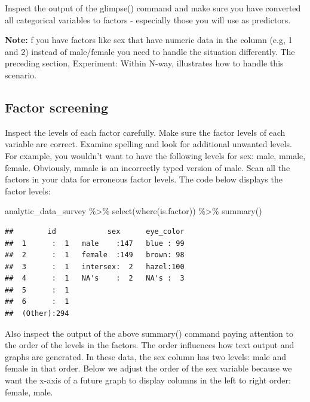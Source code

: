 \documentclass[
]{krantz}
\makeatletter
\newenvironment{Shaded}{\begin{snugshade}}{\end{snugshade}}
\newcommand{\FunctionTok}[1]{\textcolor[rgb]{0,0,0}{#1}}
\newcommand{\NormalTok}[1]{#1}
\newcommand{\SpecialCharTok}[1]{\textcolor[rgb]{0,0,0}{#1}}
\newenvironment{kframe}{%
\medskip{}
\setlength{\fboxsep}{.8em}
 \def\at@end@of@kframe{}%
 \ifinner\ifhmode%
  \def\at@end@of@kframe{\end{minipage}}%
  \begin{minipage}{\columnwidth}%
 \fi\fi%
 \def\FrameCommand##1{\hskip\@totalleftmargin \hskip-\fboxsep
 \colorbox{shadecolor}{##1}\hskip-\fboxsep
     \hskip-\linewidth \hskip-\@totalleftmargin \hskip\columnwidth}%
 \MakeFramed {\advance\hsize-\width
   \@totalleftmargin\z@ \linewidth\hsize
   \@setminipage}}%
 {\par\unskip\endMakeFramed%
 \at@end@of@kframe}
\renewenvironment{Shaded}{\begin{kframe}}{\end{kframe}}
\makeatother
\begin{document}
Inspect the output of the glimpse() command and make sure you have converted all categorical variables to factors - especially those you will use as predictors.

\textbf{Note:} f you have factors like sex that have numeric data in the column (e.g, 1 and 2) instead of male/female you need to handle the situation differently. The preceding section, Experiment: Within N-way, illustrates how to handle this scenario.

\hypertarget{factor-screening-3}{%
\subsection{Factor screening}\label{factor-screening-3}}

Inspect the levels of each factor carefully. Make sure the factor levels of each variable are correct. Examine spelling and look for additional unwanted levels. For example, you wouldn't want to have the following levels for sex: male, mmale, female. Obviously, mmale is an incorrectly typed version of male. Scan all the factors in your data for erroneous factor levels. The code below displays the factor levels:

\begin{Shaded}
\begin{Highlighting}[]
\NormalTok{analytic\_data\_survey }\SpecialCharTok{\%\textgreater{}\%}
  \FunctionTok{select}\NormalTok{(}\FunctionTok{where}\NormalTok{(is.factor)) }\SpecialCharTok{\%\textgreater{}\%}
  \FunctionTok{summary}\NormalTok{()}
\end{Highlighting}
\end{Shaded}

\begin{verbatim}
##        id            sex      eye_color  
##  1      :  1   male    :147   blue : 99  
##  2      :  1   female  :149   brown: 98  
##  3      :  1   intersex:  2   hazel:100  
##  4      :  1   NA's    :  2   NA's :  3  
##  5      :  1                             
##  6      :  1                             
##  (Other):294
\end{verbatim}

Also inspect the output of the above summary() command paying attention to the order of the levels in the factors. The order influences how text output and graphs are generated. In these data, the sex column has two levels: male and female in that order. Below we adjust the order of the sex variable because we want the x-axis of a future graph to display columns in the left to right order: female, male.
\end{document}
